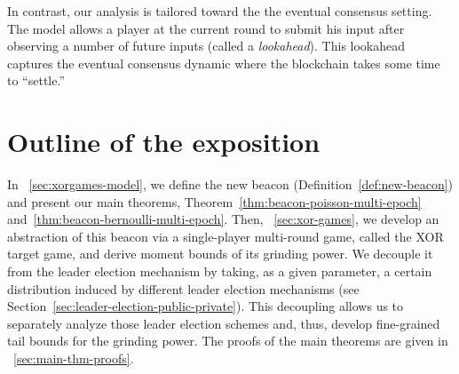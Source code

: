        In contrast, our analysis is tailored toward the the eventual consensus setting.
        The model allows a player at the current round to 
        submit his input after observing a number of future inputs 
        (called a \emph{lookahead}). 
        This lookahead captures the eventual consensus dynamic 
        where the blockchain takes some time to ``settle.'' 




\section{Outline of the exposition}
In \Section~\ref{sec:xorgames-model}, 
we define the new beacon (Definition~\ref{def:new-beacon}) and present our main theorems, 
Theorem~\ref{thm:beacon-poisson-multi-epoch} 
and~\ref{thm:beacon-bernoulli-multi-epoch}. 
Then, \Section~\ref{sec:xor-games}, we develop an abstraction of this beacon 
via a single-player multi-round game, called the XOR target game, 
and derive moment bounds of its grinding power. 
We decouple it from the leader election mechanism by taking,
as a given parameter, 
a certain distribution induced by different leader election mechanisms 
(see Section~\ref{sec:leader-election-public-private}). 
This decoupling allows us to separately analyze those leader election schemes 
and, thus, develop fine-grained 
tail bounds for the grinding power. 
The proofs of the main theorems are given in \Section~\ref{sec:main-thm-proofs}.




